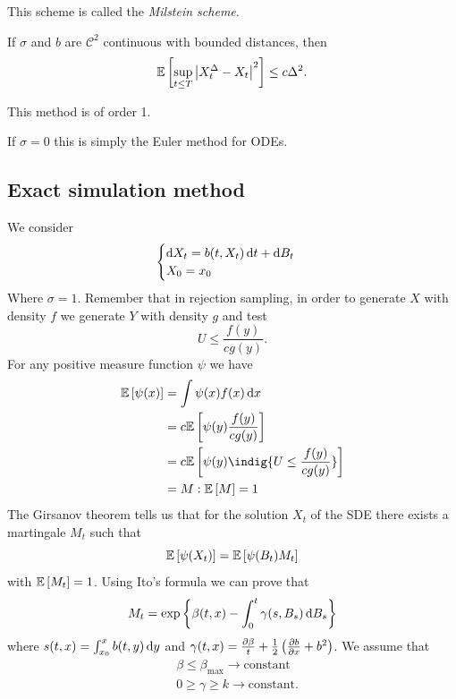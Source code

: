 \documentclass[12pt]{report}
\begin{document}
This scheme is called the \emph{Milstein scheme}.
\begin{theorem}
	If $\sigma$ and $b$ are $\mathscr{C}^{2}$ continuous with bounded distances, then
	\begin{equation*}
		\mathbb{E}\left[\sup_{t\leq T}\left|X^{\Delta}_{t}-X_{t}\right|^{2}\right]\leq c\Delta^{2}.
	\end{equation*}
\end{theorem}
This method is of order 1.
\begin{remark}
	If $\sigma=0$ this is simply the Euler method for ODEs.
\end{remark}
\subsection{Exact simulation method}
We consider 
\begin{equation*}
	\begin{cases}
		\mathop{}\!\mathrm{d} X_t=b(t,X_t)\mathop{}\!\mathrm{d} t+\mathop{}\!\mathrm{d} B_t\\
		X_0=x_0
	\end{cases}
\end{equation*}
Where $\sigma=1$. Remember that in rejection sampling, in order to generate $X$ with density $f$ we generate $Y$ with density $g$ and test
\begin{equation*}
	U\leq\frac{f(y)}{cg(y)}.
\end{equation*}
For any positive measure function $\psi$ we have
\begin{align*}
	\ev{\psi(x)}&=\int\psi(x)f(x)\dx\\
	&=c\ev{\psi(y)\frac{f(y)}{cg(y)}}\\
	&=c\ev{\psi(y)\indig{U\leq\frac{f(y)}{cg(y)}}}\\
	&=M:\ev{M}=1
\end{align*}
The Girsanov theorem tells us that for the solution $X_t$ of the SDE there exists a martingale $M_{t}$ such that
\begin{equation*}
	\mathbb{E}\left[\psi(X_t)\right]=\mathbb{E}\left[\psi(B_{t})M_{t}\right]
\end{equation*}
with $\mathbb{E}\left[M_{t}\right]=1$. Using Ito's formula we can prove that
\begin{equation*}
	M_{t}=\exp\left\{\beta(t,x)-\int_{0}^{t}\gamma(s,B_s)
		\mathop{}\!\mathrm{d} B_s\right\}
\end{equation*}
where $s(t,x)=\int_{x_0}^{x}b(t,y)\mathop{}\!\mathrm{d} y$ and $\gamma(t,x)=\frac{\partial \beta}{t}+\frac{1}{2}\left(\frac{\partial b}{\partial x}+b^{2}\right)$. We assume that
\begin{align*}
	&\beta\leq\beta_{\max}\to\text{constant}\\
	&0\geq\gamma\geq k\to\text{constant}.
\end{align*}
\end{document}
